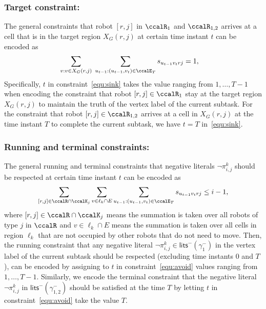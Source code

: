 \documentclass[Afour,sageh,times]{sagej}
\renewcommand{\ap}[3]{\mathcal{\pi}_{{#1},{#2}}^{#3}}
\begin{document}
{\subsubsection{Target constraint:}
The general constraints that robot $[r,j]$ in $\ccalR_1$ and $\ccalR_{1,2}$  arrives at a cell that is in the target region $X_G(r,j)$ at certain time instant $t$ can be encoded as
\begingroup\makeatletter\def\f@size{10}\check@mathfonts
\def\maketag@@@#1{\hbox{\m@th\normalsize\normalfont#1}}%
\begingroup
  \begin{align}\label{equ:sink}
  \sum_{v: v \in X_G(r,j) } \;\sum_{u_{t-1}:(u_{t-1}, v_{t}) \in \ccalE_T} s_{u_{t-1} v_{t} rj} &  = 1,
  \end{align}
  \endgroup
 Specifically, $t$ in constraint~\eqref{equ:sink} takes the value ranging from $1, \ldots, T-1$ when encoding the constraint that robot $[r,j] \in\ccalR_1$  stay at the target region $X_G(r,j)$ to maintain the truth of  the vertex label of the current subtask.  For the constraint that robot $[r,j]\in\ccalR_{1,2} $ arrives at a cell in $X_G(r,j)$ at the time instant $T$ to complete the current subtask, we have $t = T$ in~\eqref{equ:sink}. %

 \subsubsection{Running and terminal constraints:} The general running and terminal constraints that negative literals $\neg \ap{i}{j}{k}$ should be respected at certain time instant $t$ can be encoded as
   \begingroup\makeatletter\def\f@size{10}\check@mathfonts
\def\maketag@@@#1{\hbox{\m@th\normalsize\normalfont#1}}%
\begin{align}\label{equ:avoid}
  \sum_{[r,j]\in \ccalR \cap \ccalK_j} \sum_{v \in \ell_k \cap E}   \sum_{u_{t-1}: (u_{t-1}, v_{t}) \in \ccalE_T} s_{u_{t-1} v_{t} r j } \leq i - 1,
\end{align}
\endgroup
where $[r,j] \in \ccalR \cap \ccalK_j$ means the summation is taken over all robots of type $j$ in $\ccalR$ and $v \in \ell_k \cap E$ means the summation is taken over all cells in region $\ell_k$ that are not occupied by other robots that do not need to move. Then, the running constraint that any
negative literal $\neg\ap{i}{j}{k} \in \mathsf{lits}^-(\gamma_1^-)$ in the vertex label of the current subtask should be respected (excluding time instants $0 $ and $T$), can be encoded by assigning to $t$ in constraint~\eqref{equ:avoid} values ranging from $1, \ldots, T-1$. Similarly, we encode the terminal constraint that the negative literal  $\neg\ap{i}{j}{k}$ in $\mathsf{lits}^-(\gamma_{1,2}^-)$  should be satisfied at the time $T$ by letting $t$ in constraint~\eqref{equ:avoid} take the value $T$.
}
\end{document}
